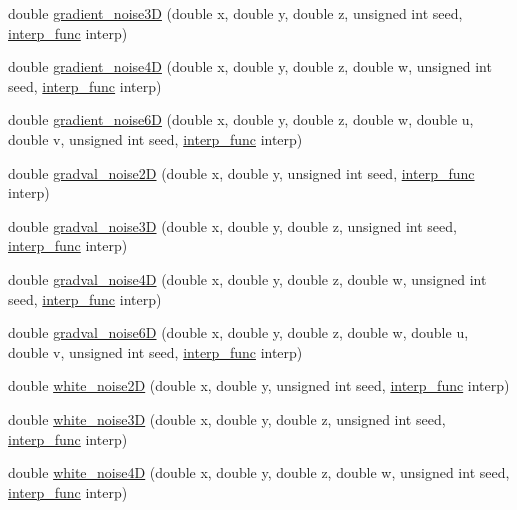 \begin{DoxyCompactItemize}
\item 
double \hyperlink{namespaceanl_a066bdeb1dd668118063b9b22218a0513}{gradient\_\-noise3D} (double x, double y, double z, unsigned int seed, \hyperlink{namespaceanl_a2c8cd5d25499b47ef49c82dea75ba8dd}{interp\_\-func} interp)
\item 
double \hyperlink{namespaceanl_a3db30890d9320d87f40afe3be85dfcf7}{gradient\_\-noise4D} (double x, double y, double z, double w, unsigned int seed, \hyperlink{namespaceanl_a2c8cd5d25499b47ef49c82dea75ba8dd}{interp\_\-func} interp)
\item 
double \hyperlink{namespaceanl_ac98904b69077be4f5b3719ec1f564019}{gradient\_\-noise6D} (double x, double y, double z, double w, double u, double v, unsigned int seed, \hyperlink{namespaceanl_a2c8cd5d25499b47ef49c82dea75ba8dd}{interp\_\-func} interp)
\item 
double \hyperlink{namespaceanl_a27be7e27fc1d1e8b8b4366652bec4420}{gradval\_\-noise2D} (double x, double y, unsigned int seed, \hyperlink{namespaceanl_a2c8cd5d25499b47ef49c82dea75ba8dd}{interp\_\-func} interp)
\item 
double \hyperlink{namespaceanl_a218cc7d19c11589f3fb6a7eb10614f8a}{gradval\_\-noise3D} (double x, double y, double z, unsigned int seed, \hyperlink{namespaceanl_a2c8cd5d25499b47ef49c82dea75ba8dd}{interp\_\-func} interp)
\item 
double \hyperlink{namespaceanl_ab001aaabd4e3d5bb17f92528d19af695}{gradval\_\-noise4D} (double x, double y, double z, double w, unsigned int seed, \hyperlink{namespaceanl_a2c8cd5d25499b47ef49c82dea75ba8dd}{interp\_\-func} interp)
\item 
double \hyperlink{namespaceanl_a4dbfce5cf887da55b7cbb455ec6bf1d4}{gradval\_\-noise6D} (double x, double y, double z, double w, double u, double v, unsigned int seed, \hyperlink{namespaceanl_a2c8cd5d25499b47ef49c82dea75ba8dd}{interp\_\-func} interp)
\item 
double \hyperlink{namespaceanl_abe4c05c9d3bf651fedbb1c143283c662}{white\_\-noise2D} (double x, double y, unsigned int seed, \hyperlink{namespaceanl_a2c8cd5d25499b47ef49c82dea75ba8dd}{interp\_\-func} interp)
\item 
double \hyperlink{namespaceanl_a824656324d25886d98d4ee327db1a28e}{white\_\-noise3D} (double x, double y, double z, unsigned int seed, \hyperlink{namespaceanl_a2c8cd5d25499b47ef49c82dea75ba8dd}{interp\_\-func} interp)
\item 
double \hyperlink{namespaceanl_a91cc8329cfa4e902aa4fd64dd7291d47}{white\_\-noise4D} (double x, double y, double z, double w, unsigned int seed, \hyperlink{namespaceanl_a2c8cd5d25499b47ef49c82dea75ba8dd}{interp\_\-func} interp)

\end{DoxyCompactItemize}
